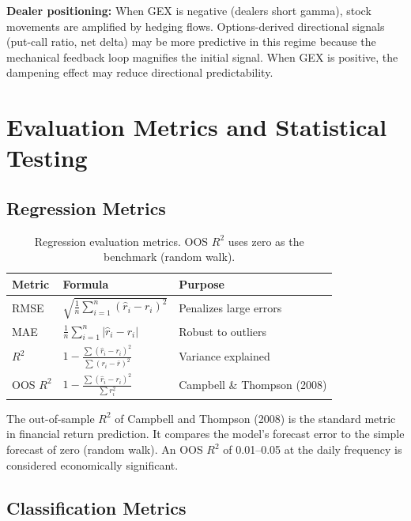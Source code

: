 \documentclass[11pt,a4paper]{article}
\begin{document}
\textbf{Dealer positioning:} When GEX is negative (dealers short gamma), stock movements are amplified by hedging flows. Options-derived directional signals (put-call ratio, net delta) may be more predictive in this regime because the mechanical feedback loop magnifies the initial signal. When GEX is positive, the dampening effect may reduce directional predictability.


\section{Evaluation Metrics and Statistical Testing}

\subsection{Regression Metrics}

\begin{table}[H]
\centering
\begin{tabular}{@{}lll@{}}
\toprule
\textbf{Metric} & \textbf{Formula} & \textbf{Purpose} \\
\midrule
RMSE & $\sqrt{\frac{1}{n}\sum_{i=1}^{n}(\hat{r}_i - r_i)^2}$ & Penalizes large errors \\[6pt]
MAE & $\frac{1}{n}\sum_{i=1}^{n}|\hat{r}_i - r_i|$ & Robust to outliers \\[6pt]
$R^2$ & $1 - \frac{\sum(\hat{r}_i - r_i)^2}{\sum(r_i - \bar{r})^2}$ & Variance explained \\[6pt]
OOS $R^2$ & $1 - \frac{\sum(\hat{r}_i - r_i)^2}{\sum r_i^2}$ & Campbell \& Thompson (2008) \\
\bottomrule
\end{tabular}
\caption{Regression evaluation metrics. OOS $R^2$ uses zero as the benchmark (random walk).}
\end{table}

The out-of-sample $R^2$ of Campbell and Thompson (2008) is the standard metric in financial return prediction. It compares the model's forecast error to the simple forecast of zero (random walk). An OOS $R^2$ of 0.01--0.05 at the daily frequency is considered economically significant.

\subsection{Classification Metrics}
\end{document}
